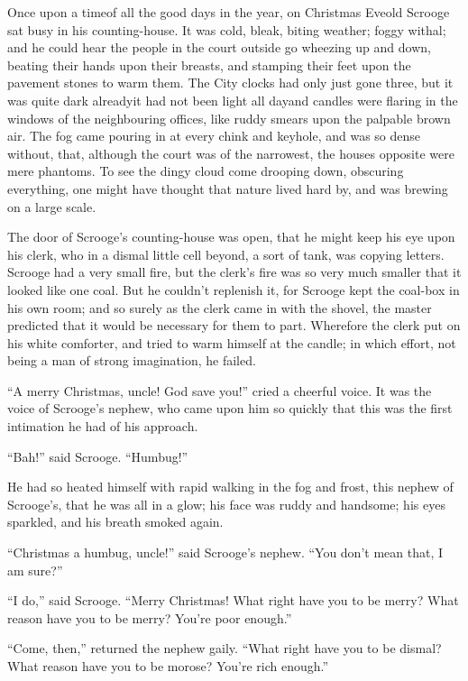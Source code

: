 \documentclass[paper=5.5in:8.5in,BCOR=7mm,twoside,DIV=calc,12pt,usegeometry]{scrbook} %
\begin{document}
Once upon a time\textemdash of all the good days in the year, on Christmas Eve\textemdash old Scrooge sat busy in his counting-house. It was cold, bleak, biting weather; foggy withal; and he could hear the people in the court outside go wheezing up and down, beating their hands upon their breasts, and stamping their feet upon the pavement stones to warm them. The City clocks had only just gone three, but it was quite dark already\textemdash it had not been light all day\textemdash and candles were flaring in the windows of the neighbouring offices, like ruddy smears upon the palpable brown air. The fog came pouring in at every chink and keyhole, and was so dense without, that, although the court was of the narrowest, the houses opposite were mere phantoms. To see the dingy cloud come drooping down, obscuring everything, one might have thought that nature lived hard by, and was brewing on a large scale.

The door of Scrooge's counting-house was open, that he might keep his eye upon his clerk, who in a dismal little cell beyond, a sort of tank, was copying letters. Scrooge had a very small fire, but the clerk's fire was so very much smaller that it looked like one coal. But he couldn't replenish it, for Scrooge kept the coal-box in his own room; and so surely as the clerk came in with the shovel, the master predicted that it would be necessary for them to part. Wherefore the clerk put on his white comforter, and tried to warm himself at the candle; in which effort, not being a man of strong imagination, he failed.

\enquote{A merry Christmas, uncle! God save you!} cried a cheerful voice. It was the voice of Scrooge's nephew, who came upon him so quickly that this was the first intimation he had of his approach.

\enquote{Bah!} said Scrooge. \enquote{Humbug!}

He had so heated himself with rapid walking in the fog and frost, this nephew of Scrooge's, that he was all in a glow; his face was ruddy and handsome; his eyes sparkled, and his breath smoked again.

\enquote{Christmas a humbug, uncle!} said Scrooge's nephew. \enquote{You don't mean that, I am sure?}

\enquote{I do,} said Scrooge. \enquote{Merry Christmas! What right have you to be merry? What reason have you to be merry? You're poor enough.}

\enquote{Come, then,} returned the nephew gaily. \enquote{What right have you to be dismal? What reason have you to be morose? You're rich enough.}
\end{document}

